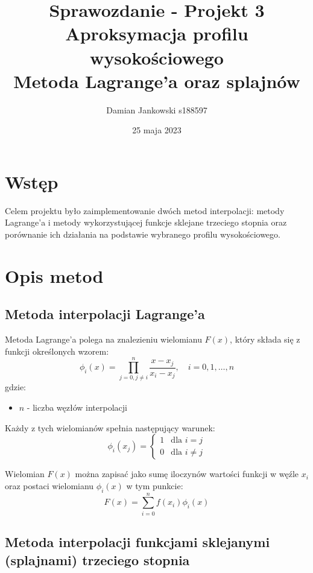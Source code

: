 \documentclass{article}
\title{Sprawozdanie - Projekt 3 \\ Aproksymacja profilu wysokościowego \\
Metoda Lagrange'a oraz splajnów}
\author{Damian Jankowski s188597}
\date{25 maja 2023}
\begin{document}
\maketitle

\tableofcontents

\section{Wstęp}

Celem projektu było zaimplementowanie dwóch metod interpolacji: 
metody Lagrange'a i metody wykorzystującej funkcje sklejane trzeciego stopnia
oraz porównanie ich działania na podstawie wybranego profilu wysokościowego.

\section{Opis metod}

\subsection{Metoda interpolacji Lagrange'a}

Metoda Lagrange'a polega na znalezieniu wielomianu $F(x)$, który składa się z funkcji określonych wzorem:
\begin{equation}
   \phi_i(x) = \prod_{j=0, j \neq i}^{n} \frac{x - x_j}{x_i - x_j}, \quad i = 0, 1, \dots, n
\end{equation}
gdzie:
\begin{itemize}
    \item $n$ - liczba węzłów interpolacji
\end{itemize}

Każdy z tych wielomianów spełnia następujący warunek:
\begin{equation}
    \phi_i(x_j) = \begin{cases}
        1 & \text{dla } i = j \\
        0 & \text{dla } i \neq j
    \end{cases}
\end{equation}

Wielomian $F(x)$ można zapisać jako sumę iloczynów wartości funkcji w węźle $x_i$ oraz
postaci wielomianu $\phi_i(x)$ w tym punkcie:
\begin{equation}
    F(x) = \sum_{i=0}^{n} f(x_i) \phi_i(x)
\end{equation}

\subsection{Metoda interpolacji funkcjami sklejanymi (splajnami) trzeciego stopnia}
\end{document}
